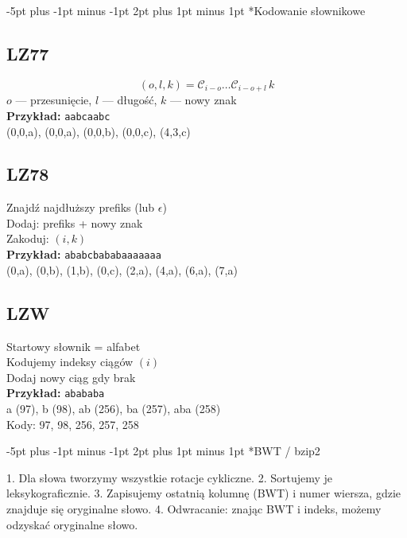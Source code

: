 \documentclass{notatki}
\makeatletter
\renewcommand\section{\@startsection {section}{1}{\z@}%
  {-5pt plus -1pt minus -1pt}%
  {2pt plus 1pt minus 1pt}%
  {\normalfont\large\bfseries}} %
\makeatother
\begin{document}
\begin{multicols}{2}
\section*{Kodowanie słownikowe}

\begin{multicols}{3}
\subsection*{LZ77}
\[
(o, l, k) = \mathcal{C}_{i - o} \dots \mathcal{C}_{i - o + l} \, k
\]
\footnotesize
$o$ — przesunięcie, $l$ — długość, $k$ — nowy znak \\
\textbf{Przykład:} \texttt{aabcaabc} \\
(0,0,a), (0,0,a), (0,0,b), (0,0,c), (4,3,c)

\vfill\null
\columnbreak

\subsection*{LZ78}
\footnotesize
Znajdź najdłuższy prefiks (lub $\epsilon$) \\
Dodaj: prefiks + nowy znak \\
Zakoduj: $(i,k)$ \\
\textbf{Przykład:} \texttt{ababcbababaaaaaaa} \\
(0,a), (0,b), (1,b), (0,c), (2,a), (4,a), (6,a), (7,a)

\vfill\null
\columnbreak

\subsection*{LZW}
\footnotesize
Startowy słownik = alfabet \\
Kodujemy indeksy ciągów $(i)$ \\
Dodaj nowy ciąg gdy brak \\
\textbf{Przykład:} \texttt{abababa} \\
a (97), b (98), ab (256), ba (257), aba (258) \\
Kody: 97, 98, 256, 257, 258
\end{multicols}

\vspace{-3em}
  
  \section*{BWT / bzip2}

    1. Dla słowa tworzymy wszystkie rotacje cykliczne.
    2. Sortujemy je leksykograficznie.
    3. Zapisujemy ostatnią kolumnę (BWT) i numer wiersza, gdzie znajduje się oryginalne słowo.
    4. Odwracanie: znając BWT i indeks, możemy odzyskać oryginalne słowo.
  

\end{multicols}
\end{document}
